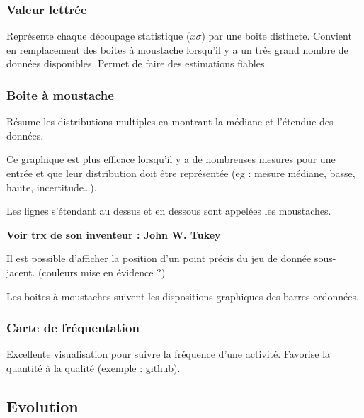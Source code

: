 \documentclass[a4paper,12pt]{article}
\begin{document}
\begin{multicols}{2}
\subsubsection*{Valeur lettrée}
\label{sec:org473070e}
Représente chaque découpage statistique (\(x\sigma\)) par une boite distincte. Convient en remplacement des boites à moustache lorsqu'il y a un très grand nombre de données disponibles. Permet de faire des estimations fiables. \autocite{hofmannLettervaluePlotsBoxplots2017,mikeyiHowChooseRight2020}
\subsubsection*{Boite à moustache}
\label{sec:org9702e24}
Résume les distributions multiples en montrant la médiane et l'étendue des données. \autocite{alansmithLexiqueVisuel}

Ce graphique est plus efficace lorsqu'il y a de nombreuses mesures pour une entrée et que leur distribution doit être représentée (eg : mesure médiane, basse, haute, incertitude\ldots{}). \autocite{mikeyiHowChooseRight2020}

Les lignes s'étendant au dessus et en dessous sont appelées les moustaches. \autocite{wilkeVisualizingManyDistributions2019}

\textbf{Voir trx de son inventeur : John W. Tukey}

Il est possible d'afficher la position d'un point précis du jeu de donnée sous-jacent. (couleurs mise en évidence ?)

Les boites à moustaches suivent les dispositions graphiques des barres ordonnées. \autocite{stephenfewComponentlevelGraphDesign2012}
\subsubsection*{Carte de fréquentation}
\label{sec:orga023399}
Excellente visualisation pour suivre la fréquence d'une activité. Favorise la quantité à la qualité (exemple : github). \autocite{alansmithLexiqueVisuel}
\subsection*{Evolution}
\label{sec:org6c09f38}


\end{multicols}
\end{document}
